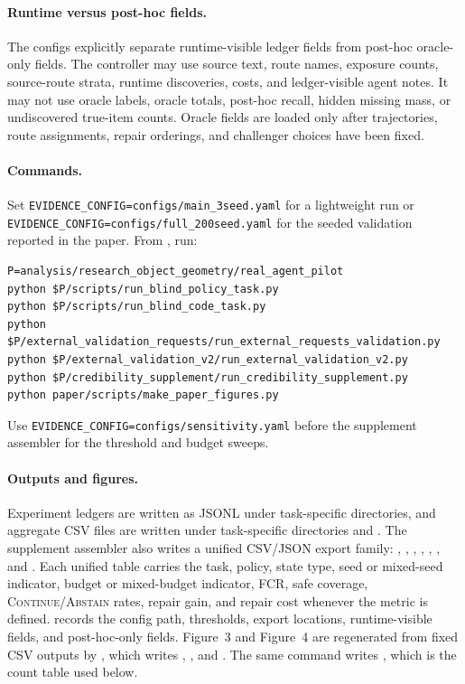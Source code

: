 \documentclass[letterpaper,10pt]{article}
\newcommand{\cont}{\textsc{Continue}}
\newcommand{\abstain}{\textsc{Abstain}}
\begin{document}
\paragraph{Runtime versus post-hoc fields.}
The configs explicitly separate runtime-visible ledger fields from post-hoc
oracle-only fields. The controller may use source text, route names, exposure
counts, source-route strata, runtime discoveries, costs, and ledger-visible
agent notes. It may not use oracle labels, oracle totals, post-hoc recall,
hidden missing mass, or undiscovered true-item counts. Oracle fields are loaded
only after trajectories, route assignments, repair orderings, and challenger
choices have been fixed.

\paragraph{Commands.}
Set \texttt{EVIDENCE\_CONFIG=configs/main\_3seed.yaml} for a lightweight run
or \texttt{EVIDENCE\_CONFIG=configs/full\_200seed.yaml} for the seeded
validation reported in the paper. From , run:
\begin{verbatim}
P=analysis/research_object_geometry/real_agent_pilot
python $P/scripts/run_blind_policy_task.py
python $P/scripts/run_blind_code_task.py
python $P/external_validation_requests/run_external_requests_validation.py
python $P/external_validation_v2/run_external_validation_v2.py
python $P/credibility_supplement/run_credibility_supplement.py
python paper/scripts/make_paper_figures.py
\end{verbatim}
Use \texttt{EVIDENCE\_CONFIG=configs/sensitivity.yaml} before the supplement
assembler for the threshold and budget sweeps.

\paragraph{Outputs and figures.}
Experiment ledgers are written as JSONL under task-specific 
directories, and aggregate CSV files are written under task-specific
 directories and
.
The supplement assembler also writes a unified CSV/JSON export family:
, ,
,
,
,
, and
. Each unified table carries the task, policy,
state type, seed or mixed-seed indicator, budget or mixed-budget indicator, FCR,
safe coverage, \cont{}/\abstain{} rates, repair gain, and repair cost whenever
the metric is defined.  records the config
path, thresholds, export locations, runtime-visible fields, and post-hoc-only
fields.
Figure~3 and Figure~4 are regenerated from fixed CSV outputs by
, which writes
,
, and
. The same command writes
, which is the count
table used below.
\end{document}
